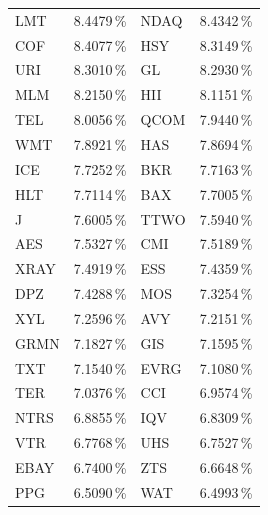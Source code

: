 \begin{longtable}{l c | l c}
    LMT    & 8.4479\,\%             & NDAQ   & 8.4342\,\%                                    \\
    COF    & 8.4077\,\%             & HSY    & 8.3149\,\%                                    \\
    URI    & 8.3010\,\%             & GL     & 8.2930\,\%                                    \\
    MLM    & 8.2150\,\%             & HII    & 8.1151\,\%                                    \\
    TEL    & 8.0056\,\%             & QCOM   & 7.9440\,\%                                    \\
    WMT    & 7.8921\,\%             & HAS    & 7.8694\,\%                                    \\
    ICE    & 7.7252\,\%             & BKR    & 7.7163\,\%                                    \\
    HLT    & 7.7114\,\%             & BAX    & 7.7005\,\%                                    \\
    J      & 7.6005\,\%             & TTWO   & 7.5940\,\%                                    \\
    AES    & 7.5327\,\%             & CMI    & 7.5189\,\%                                    \\
    XRAY   & 7.4919\,\%             & ESS    & 7.4359\,\%                                    \\
    DPZ    & 7.4288\,\%             & MOS    & 7.3254\,\%                                    \\
    XYL    & 7.2596\,\%             & AVY    & 7.2151\,\%                                    \\
    GRMN   & 7.1827\,\%             & GIS    & 7.1595\,\%                                    \\
    TXT    & 7.1540\,\%             & EVRG   & 7.1080\,\%                                    \\
    TER    & 7.0376\,\%             & CCI    & 6.9574\,\%                                    \\
    NTRS   & 6.8855\,\%             & IQV    & 6.8309\,\%                                    \\
    VTR    & 6.7768\,\%             & UHS    & 6.7527\,\%                                    \\
    EBAY   & 6.7400\,\%             & ZTS    & 6.6648\,\%                                    \\
    PPG    & 6.5090\,\%             & WAT    & 6.4993\,\%                                    \\

\end{longtable}
